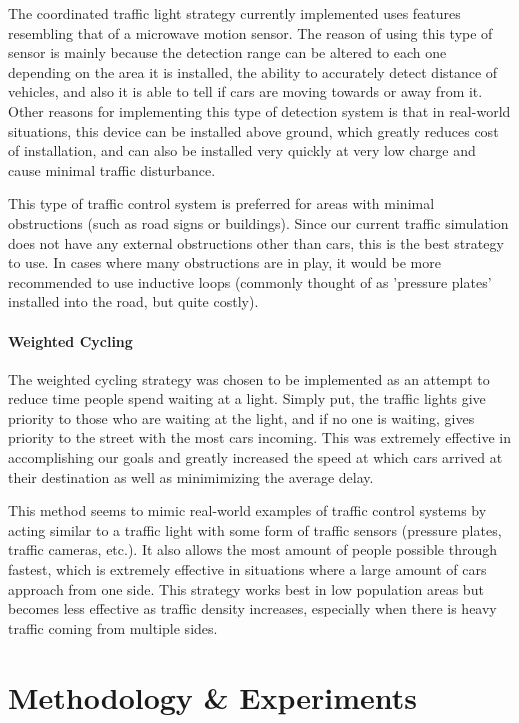 \documentclass[10pt]{article}
\begin{document}
The coordinated traffic light strategy currently implemented uses features resembling that of a microwave motion sensor.  The reason of using this type of sensor is mainly because the detection range can be altered to each one depending on the area it is installed, the ability to accurately detect distance of vehicles, and also it is able to tell if cars are moving towards or away from it.  Other reasons for implementing this type of detection system is that in real-world situations, this device can be installed above ground, which greatly reduces cost of installation, and can also be installed very quickly at very low charge and cause minimal traffic disturbance.

This type of traffic control system is preferred for areas with minimal obstructions (such as road signs or buildings).  Since our current traffic simulation does not have any external obstructions other than cars, this is the best strategy to use.  In cases where many obstructions are in play, it would be more recommended to use inductive loops (commonly thought of as 'pressure plates' installed into the road, but quite costly).

\paragraph{Weighted Cycling} The weighted cycling strategy was chosen to be implemented as an attempt to reduce time people spend waiting at a light.  Simply put, the traffic lights give priority to those who are waiting at the light, and if no one is waiting, gives priority to the street with the most cars incoming.  This was extremely effective in accomplishing our goals and greatly increased the speed at which cars arrived at their destination as well as minimimizing the average delay. 

This method seems to mimic real-world examples of traffic control systems by acting similar to a traffic light with some form of traffic sensors (pressure plates, traffic cameras, etc.).  It also allows the most amount of people possible through fastest, which is extremely effective in situations where a large amount of cars approach from one side.  This strategy works best in low population areas but becomes less effective as traffic density increases, especially when there is heavy traffic coming from multiple sides.

\section{Methodology \& Experiments}
\label{sec:experiments}
\end{document}
